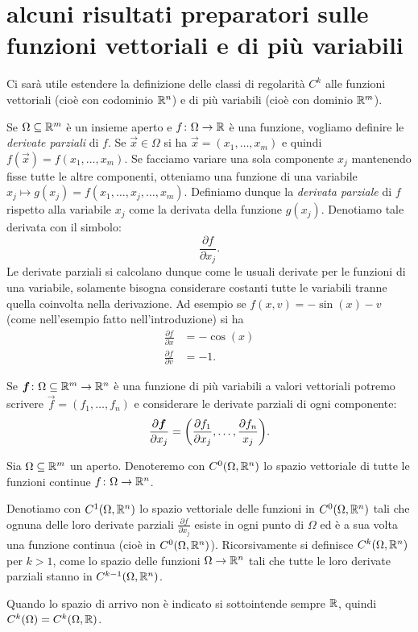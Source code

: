 \section[funzioni vettoriali e di più variabili]{alcuni risultati preparatori
sulle funzioni vettoriali e di più variabili}

Ci sarà utile estendere la definizione delle classi di regolarità $C^k$ alle
funzioni vettoriali (cioè con codominio $\mathbb R^n$) e di più variabili
(cioè con dominio $\mathbb R^m$).

Se $\Omega\subseteq \mathbb R^m$ è un insieme aperto e $f\colon \Omega \to \mathbb R$
è una funzione, vogliamo definire le \emph{derivate parziali} di $f$.
Se $\vec x \in \Omega$ si ha $\vec x = (x_1,\dots, x_m)$ e quindi
$f(\vec x) = f(x_1,\dots, x_m)$. Se facciamo variare una sola componente
$x_j$ mantenendo fisse tutte le altre componenti, otteniamo una funzione
di una variabile $x_j \mapsto g(x_j) = f(x_1,\dots, x_j, \dots, x_m)$.
Definiamo dunque la \emph{derivata parziale}
di $f$ rispetto alla variabile $x_j$ come la derivata della funzione $g(x_j)$.
Denotiamo tale derivata con il simbolo:
\[
  \frac{\partial f}{\partial x_j}.
\]
Le derivate parziali si calcolano dunque come le usuali derivate per le
funzioni di una variabile, solamente bisogna considerare costanti tutte
le variabili tranne quella coinvolta nella derivazione.
Ad esempio se $f(x,v) = -\sin(x) - v$
(come nell'esempio fatto nell'introduzione) si ha
\begin{align*}
  \frac{\partial f}{\partial x} &= -\cos(x)\\
  \frac{\partial f}{\partial v} &= -1.
\end{align*}

Se $\boldsymbol f\colon \Omega \subseteq \mathbb R^m \to \mathbb R^n$ è una funzione di più
variabili a valori vettoriali potremo scrivere $\vec f = (f_1, \dots, f_n)$
e considerare le derivate parziali di ogni componente:
\[
  \frac{\partial \boldsymbol f}{\partial x_j}
  = {\left( \frac{\partial f_1}{\partial x_j}, \dots, \frac{\partial f_n}{x_j} \right)}.
\]

\begin{definition}
Sia $\Omega\subseteq \mathbb R^m$ un aperto. Denoteremo con $C^0(\Omega,\mathbb R^n)$
lo spazio vettoriale di tutte le funzioni
continue $f\colon \Omega \to \mathbb R^n$.

Denotiamo con $C^1(\Omega,\mathbb R^n)$ lo spazio vettoriale
delle funzioni in $C^0(\Omega,\mathbb R^n)$ tali che ognuna delle loro derivate
parziali $\frac{\partial f}{\partial x_j}$ esiste in ogni punto di $\Omega$ ed
è a sua volta una funzione continua (cioè in $C^0(\Omega,\mathbb R^n)$).
Ricorsivamente si definisce $C^k(\Omega,\mathbb R^n)$ per $k>1$,
come lo spazio delle funzioni $\Omega\to\mathbb R^n$ tali che tutte le loro derivate
parziali stanno in $C^{k-1}(\Omega,\mathbb R^n)$.

Quando lo spazio di arrivo non è indicato si sottointende sempre $\mathbb R$, quindi
$C^k(\Omega) = C^k(\Omega,\mathbb R)$.
\end{definition}

